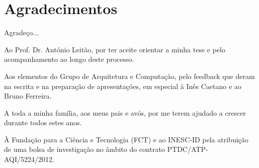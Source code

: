 
\chapter*{Agradecimentos}

Agradeço...

Ao Prof. Dr. António Leitão, por ter aceite orientar a minha tese e pelo acompanhamento ao longo deste processo.

Aos elementos do Grupo de Arquitetura e Computação, pelo feedback que deram na escrita e na preparação de apresentações, em especial à Inês Caetano e ao Bruno Ferreira.

A toda a minha família, aos meus pais e avós, por me terem ajudado a crescer durante todos estes anos.

À Fundação para a Ciência e Tecnologia (FCT) e ao INESC-ID pela atribuição de uma bolsa de investigação no âmbito do contrato PTDC/ATP-AQI/5224/2012.






